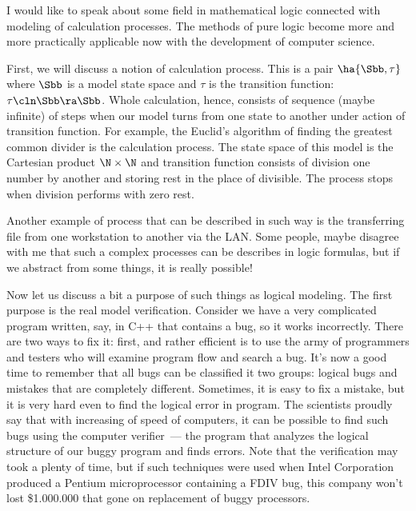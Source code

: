 \documentclass[a4paper]{article}
\begin{document}

I would like to speak about some field in mathematical logic connected with modeling of
calculation processes. The methods of pure logic become more and more practically applicable
now with the development of computer science.

First, we will discuss a notion of calculation process. This is a pair $\ha{\Sbb, \tau}$ where
$\Sbb$ is a model state space and $\tau$ is the transition function: $\tau\cln \Sbb\ra \Sbb$.
Whole calculation, hence, consists of sequence (maybe infinite) of steps when our model turns
from one state to another under action of transition function. For example, the Euclid's algorithm
of finding the greatest common divider is the calculation process. The state space of this model
is the Cartesian product $\N \times \N$ and transition function consists of division one
number by another and storing rest in the place of divisible. The process stops when division performs
with zero rest.

Another example of process that can be described in such way is the transferring file from one
workstation to another via the LAN. Some people, maybe disagree with me that such a complex processes
can be describes in logic formulas, but if we abstract from some things, it is really possible!

Now let us discuss a bit a purpose of such things as logical modeling. The first purpose is the real
model verification. Consider we have a very complicated program written, say, in C++ that contains
a bug, so it works incorrectly. There are two ways to fix it: first, and rather efficient is to use
the army of programmers and testers who will examine program flow and search a bug. It's now a good time
to remember that all bugs can be classified it two groups: logical bugs and mistakes that are completely
different. Sometimes, it is easy to fix a mistake, but it is very hard even to find the logical error in
program. The scientists proudly say that with increasing of speed of computers, it can be possible to find
such bugs using the computer verifier~--- the program that analyzes the logical structure of our buggy
program and finds errors. Note that the verification may took a plenty of time, but if such techniques were
used when Intel Corporation produced a Pentium microprocessor containing a FDIV bug, this company won't lost
\$1.000.000 that gone on replacement of buggy processors.
\end{document}
